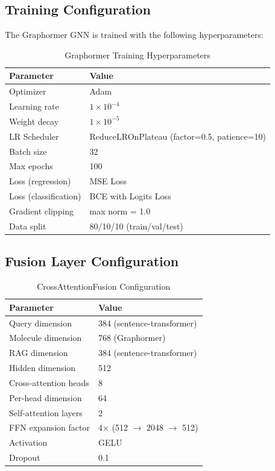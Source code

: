 \documentclass[conference]{IEEEtran}
\begin{document}
\subsection{Training Configuration}

The Graphormer GNN is trained with the following hyperparameters:

\begin{table}[h]
\centering
\caption{Graphormer Training Hyperparameters}
\label{tab:training}
\begin{tabular}{@{}ll@{}}
\toprule
\textbf{Parameter} & \textbf{Value} \\
\midrule
Optimizer & Adam \\
Learning rate & $1 \times 10^{-4}$ \\
Weight decay & $1 \times 10^{-5}$ \\
LR Scheduler & ReduceLROnPlateau (factor=0.5, patience=10) \\
Batch size & 32 \\
Max epochs & 100 \\
Loss (regression) & MSE Loss \\
Loss (classification) & BCE with Logits Loss \\
Gradient clipping & max norm = 1.0 \\
Data split & 80/10/10 (train/val/test) \\
\bottomrule
\end{tabular}
\end{table}

\subsection{Fusion Layer Configuration}

\begin{table}[h]
\centering
\caption{CrossAttentionFusion Configuration}
\label{tab:fusion_config}
\begin{tabular}{@{}ll@{}}
\toprule
\textbf{Parameter} & \textbf{Value} \\
\midrule
Query dimension & 384 (sentence-transformer) \\
Molecule dimension & 768 (Graphormer) \\
RAG dimension & 384 (sentence-transformer) \\
Hidden dimension & 512 \\
Cross-attention heads & 8 \\
Per-head dimension & 64 \\
Self-attention layers & 2 \\
FFN expansion factor & 4$\times$ (512 $\rightarrow$ 2048 $\rightarrow$ 512) \\
Activation & GELU \\
Dropout & 0.1 \\
\bottomrule
\end{tabular}
\end{table}
\end{document}

